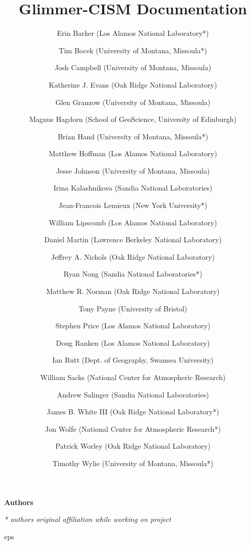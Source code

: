 

\frontmatter

\title{Glimmer-CISM {\glimmerver} Documentation}
\maketitle

\begin{center}
\textbf{\Large Authors}
\end{center}

\author{Erin Barker (Los Alamos National Laboratory*)}
\author{Tim Bocek  (University of Montana, Missoula*)}
\author{Josh Campbell  (University of Montana, Missoula)}
\author{Katherine J. Evans (Oak Ridge National Laboratory)}
\author{Glen Granzow (University of Montana, Missoula)}
\author{Magnus Hagdorn (School of GeoScience, University of Edinburgh)}
\author{Brian Hand (University of Montana, Missoula*)}
\author{Matthew Hoffman (Los Alamos National Laboratory)}
\author{Jesse Johnson (University of Montana, Missoula)}
\author{Irina Kalashnikova (Sandia National Laboratories)}
\author{Jean-Francois Lemieux (New York University*)}
\author{William Lipscomb (Los Alamos National Laboratory)}
\author{Daniel Martin (Lawrence Berkeley National Laboratory)}
\author{Jeffrey A. Nichols (Oak Ridge National Laboratory)}
\author{Ryan Nong (Sandia National Laboratories*)}
\author{Matthew R. Norman (Oak Ridge National Laboratory)}
\author{Tony Payne (University of Bristol)}
\author{Stephen Price (Los Alamos National Laboratory)}
\author{Doug Ranken (Los Alamos National Laboratory)}
\author{Ian Rutt (Dept. of Geography, Swansea University)}
\author{William Sacks (National Center for Atmospheric Research)}
\author{Andrew Salinger (Sandia National Laboratories)}
\author{James B. White III (Oak Ridge National Laboratory*)}
\author{Jon Wolfe (National Center for Atmospheric Research*)}
\author{Patrick Worley (Oak Ridge National Laboratory)}
\author{Timothy Wylie (University of Montana, Missoula*)}

\textit{* authors original affiliation while working on project}


\tableofcontents

{
         {eps} 
         {%
         } 

}
{}

